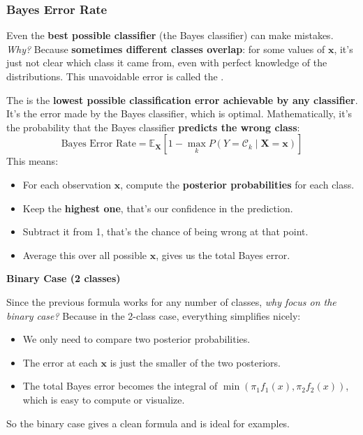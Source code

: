 \subsubsection{Bayes Error Rate}

Even the \textbf{best possible classifier} (the Bayes classifier) can make mistakes. \emph{Why?} Because \textbf{sometimes different classes overlap}: for some values of $\mathbf{x}$, it's just not clear which class it came from, even with perfect knowledge of the distributions. This unavoidable error is called the .

\highspace
The  is the \textbf{lowest possible classification error achievable by any classifier}. It's the error made by the Bayes classifier, which is optimal. Mathematically, it's the probability that the Bayes classifier \textbf{predicts the wrong class}:
\begin{equation}
    \text{Bayes Error Rate} = \mathbb{E}_{\mathbf{X}} \left[ 1 - \max_k P\left(Y = \mathcal{C}_k \mid \mathbf{X} = \mathbf{x}\right) \right]
\end{equation}
This means:
\begin{itemize}
    \item For each observation $\mathbf{x}$, compute the \textbf{posterior probabilities} for each class.
    \item Keep the \textbf{highest one}, that's our confidence in the prediction.
    \item Subtract it from 1, that's the chance of being wrong at that point.
    \item Average this over all possible $\mathbf{x}$, gives us the total Bayes error.
\end{itemize}

\highspace
\begin{flushleft}
    \textcolor{Green3}{ \textbf{Binary Case (2 classes)}}
\end{flushleft}
Since the previous formula works for any number of classes, \emph{why focus on the binary case?} Because in the 2-class case, everything simplifies nicely:
\begin{itemize}
    \item We only need to compare two posterior probabilities.
    \item The error at each $\mathbf{x}$ is just the smaller of the two posteriors.
    \item The total Bayes error becomes the integral of $\min\left(\pi_{1}f_{1}\left(x\right), \pi_{2}f_{2}\left(x\right)\right)$, which is easy to compute or visualize.
\end{itemize}
So the binary case gives a clean formula and is ideal for examples.

